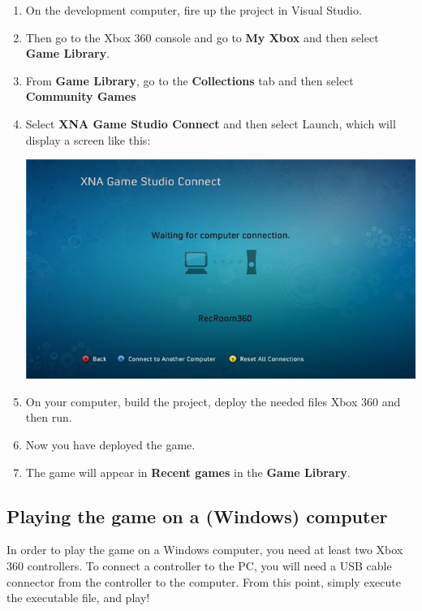 \begin{enumerate}	
	\item On the development computer, fire up the project in Visual Studio.
	\item Then go to the Xbox 360 console and go to \textbf{My Xbox} and then select \textbf{Game Library}. 
	\item From \textbf{Game Library}, go to the \textbf{Collections} tab and then select \textbf{Community Games}
	\item Select \textbf{XNA Game Studio Connect} and then select Launch, which will display a screen like this: \\ \begin{center}\includegraphics[scale=0.5]{graphics/connect2}\end{center}
	\item On your computer, build the project, deploy the needed files Xbox 360 and then run.
	\item Now you have deployed the game. 
	\item The game will appear in \textbf{Recent games} in the \textbf{Game Library}.	 
\end{enumerate}

\subsection{Playing the game on a (Windows) computer}

In order to play the game on a Windows computer, you need at least two Xbox 360 controllers. To connect a controller to the PC, you will need a USB cable connector from the controller to the computer. From this point, simply execute the executable file, and play! 
